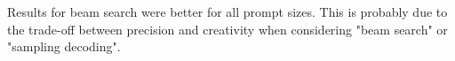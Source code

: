 Results for beam search were better for all prompt sizes.
This is probably due to the trade-off between precision and creativity when considering "beam search" or "sampling decoding".